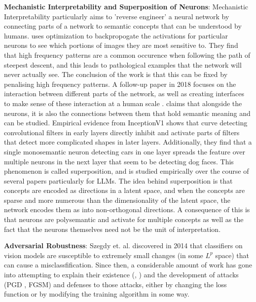 \documentclass{article}
\begin{document}
            \textbf{Mechanistic Interpretability and Superposition of Neurons}: Mechanistic Interpretability particularly aims to 'reverse engineer' a neural network by connecting parts of a network to semantic concepts that can be understood by humans. \cite{olah2017feature} uses optimization to backpropogate the activations for particular neurons to see which portions of images they are most sensitive to. They find that high frequency patterns are a common occurence when following the path of steepest descent, and this leads to pathological examples that the network will never actually see. The conclusion of the work is that this can be fixed by penalising high frequency patterns. A follow-up paper in 2018 focuses on the interaction between different parts of the network, as well as creating interfaces to make sense of these interaction at a human scale \cite{olah2018the}. \cite{olah2020zoom} claims that alongside the neurons, it is also the connections between them that hold semantic meaning and can be studied. Empirical evidence from InceptionV1 shows that curve detecting convolutional filters in early layers directly inhibit and activate parts of filters that detect more complicated shapes in later layers. Additionally, they find that a single monosemantic neuron detecting cars in one layer spreads the feature over multiple neurons in the next layer that seem to be detecting dog faces. This phenomenon is called superposition, and is studied empirically over the course of several papers \cite{elhage2022solu, elhage2022superposition, bricken2023monosemanticity, templeton2024scaling, lindsey2025biology} particularly for LLMs. The idea behind superposition is that concepts are encoded as directions in a latent space, and when the concepts are sparse and more numerous than the dimensionality of the latent space, the network encodes them as into non-orthogonal directions. A consequence of this is that neurons are polysemantic and activate for multiple concepts as well as the fact that the neurons themselves need not be the unit of interpretation.  

            \textbf{Adversarial Robustness}: Szegdy et. al. discovered \cite{szegedy2014intriguingpropertiesneuralnetworks} in 2014 that classifiers on vision models are susceptible to extremely small changes (in some $L^p$ space) that can cause a misclassfification. Since then, a considerable amount of work has gone into attempting to explain their existence (\cite{shafahi2020adversarialexamplesinevitable}, \cite{shamir2022dimpledmanifoldmodeladversarial}) and the development of attacks (PGD \cite{madry2019deeplearningmodelsresistant}, FGSM\cite{goodfellow2015explainingharnessingadversarialexamples}) and defenses to those attacks, either by changing the loss function or by modifying the training algorithm in some way. 
            
\end{document}
